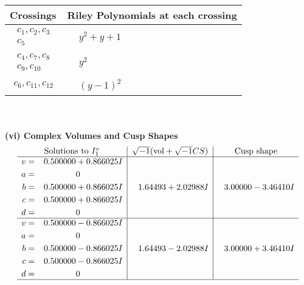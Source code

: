 \documentclass[1p]{elsarticle_modified}
\theoremstyle{definition}
\newcommand{\I}{\sqrt{-1}}
\begin{document}
\begin{tabular}{m{50pt}|m{274pt}}
Crossings & \hspace{64pt}Riley Polynomials at each crossing \\
\hline $$\begin{aligned}c_{1},c_{2},c_{3}\\c_{5}\end{aligned}$$&$\begin{aligned}
&y^2+y+1
\end{aligned}$\\
\hline $$\begin{aligned}c_{4},c_{7},c_{8}\\c_{9},c_{10}\end{aligned}$$&$\begin{aligned}
&y^2
\end{aligned}$\\
\hline $$\begin{aligned}c_{6},c_{11},c_{12}\end{aligned}$$&$\begin{aligned}
&(y-1)^2
\end{aligned}$\\
\hline
\end{tabular}\\~\\
\newpage\flushleft \textbf{(vi) Complex Volumes and Cusp Shapes}
$$\begin{array}{c|c|c}  
\text{Solutions to }I^v_{1}& \I (\text{vol} + \sqrt{-1}CS) & \text{Cusp shape}\\
 \hline 
\begin{aligned}
v &= \phantom{-}0.500000 + 0.866025 I \\
a &= \phantom{-0.000000 } 0 \\
b &= \phantom{-}0.500000 + 0.866025 I \\
c &= \phantom{-}0.500000 + 0.866025 I \\
d &= \phantom{-0.000000 } 0\end{aligned}
 & \phantom{-}1.64493 + 2.02988 I & \phantom{-}3.00000 - 3.46410 I \\ \hline\begin{aligned}
v &= \phantom{-}0.500000 - 0.866025 I \\
a &= \phantom{-0.000000 } 0 \\
b &= \phantom{-}0.500000 - 0.866025 I \\
c &= \phantom{-}0.500000 - 0.866025 I \\
d &= \phantom{-0.000000 } 0\end{aligned}
 & \phantom{-}1.64493 - 2.02988 I & \phantom{-}3.00000 + 3.46410 I\\
 \hline 
 \end{array}$$\newpage\newpage\renewcommand{\arraystretch}{1}
\end{document}
